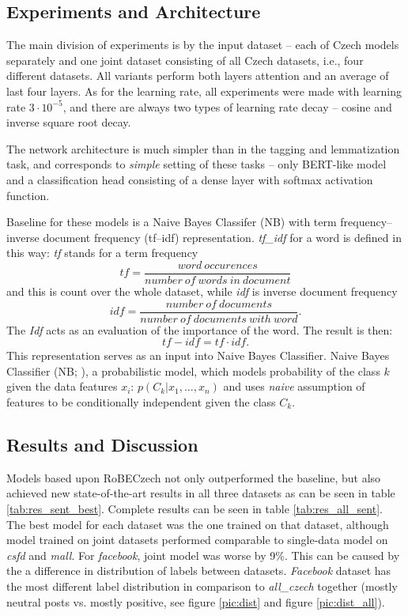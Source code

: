 \subsection{Experiments and Architecture}
The main division of experiments is by the input dataset -- each of Czech models separately and one joint dataset consisting of all Czech datasets, i.e., four different datasets. All variants perform both layers attention and an average of last four layers. As for the learning rate, all experiments were made with learning rate $3 \cdot 10^{-5}$, and there are always two types of learning rate decay -- cosine and inverse square root decay. 
\par
The network architecture is much simpler than in the tagging and lemmatization task, and corresponds to \textit{simple} setting of these tasks -- only BERT-like model and a classification head consisting of a dense layer with softmax activation function. 
\par 
Baseline for these models is a Naive Bayes Classifer (NB) with term frequency--inverse document frequency (tf--idf) representation. \textit{tf\_idf} for a word is defined in this way: \textit{tf} stands for a term frequency
\[ \mathit{tf} = \frac{word\ occurences}{number\ of\ words\ in\ document} \]
and this is count over the whole dataset, while \textit{idf} is inverse document frequency
\[\mathit{idf} = \frac{number\ of\ documents}{number\ of\ documents\ with\ word}.\] The \textit{Idf} acts as an evaluation of the importance of the word. The result is then: \[\mathit{tf-idf} = tf \cdot idf .\] 
This representation serves as an input into Naive Bayes Classifier. Naive Bayes Classifier (NB; \citealp{ duda1973pattern}), a probabilistic model, which models probability of the class $k$ given the data features $x_i$: $p(C_k|x_1,...,x_n)$ and uses \textit{naive} assumption of features to be conditionally independent given the class $C_k$.

\subsection{Results and Discussion}
Models based upon RoBECzech not only outperformed the baseline, but also achieved new state-of-the-art results in all three datasets as can be seen in table \ref{tab:res_sent_best}. Complete results can be seen in table \ref{tab:res_all_sent}. The best model for each dataset was the one trained on that dataset, although model trained on joint datasets performed comparable to single-data model on \textit{csfd} and \textit{mall}. For \textit{facebook}, joint model was worse by 9\%. This can be caused by the a difference in distribution of labels between datasets. \textit{Facebook} dataset has the most different label distribution in comparison to \textit{all\_czech} together (mostly neutral posts vs. mostly positive, see figure \ref{pic:dist} and figure \ref{pic:dist_all}). 

